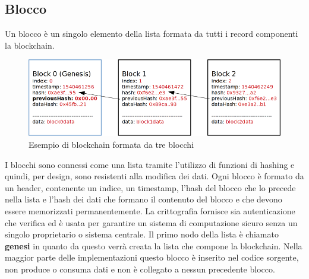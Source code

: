 \begin{enumerate}[1.]
\subsection{Blocco}
Un blocco è un singolo elemento della lista formata da tutti i record componenti la blockchain.
\begin{figure}[H]
    \centering
    \includegraphics[width=\textwidth]{images/blockchain_basic.png}
    \caption{Esempio di blockchain formata da tre blocchi}
\end{figure}
I blocchi sono connessi come una lista tramite l'utilizzo di funzioni di hashing e quindi, per design, sono resistenti alla modifica dei dati. Ogni blocco è formato da un header, contenente un indice, un timestamp, l'hash del blocco che lo precede nella lista e l'hash dei dati che formano il contenuto del blocco e che devono essere memorizzati permanentemente.\newline
La crittografia fornisce sia autenticazione che verifica ed è usata per garantire un sistema di computazione sicuro senza un singolo proprietario o sistema centrale.\newline
Il primo nodo della lista è chiamato \textbf{genesi} in quanto da questo verrà creata la lista che compone la blockchain. Nella maggior parte delle implementazioni questo blocco è inserito nel codice sorgente, non produce o consuma dati e non è collegato a nessun precedente blocco.
\begin{table}[H]
    \caption{Blocco \textit{genesi} della blockchain per i Bitcoin, il timestamp corrisponde alla data di Sabato 3 Gennaio 2009 alle ore 18:15:05}
    \centering
\end{table}
\end{enumerate}
